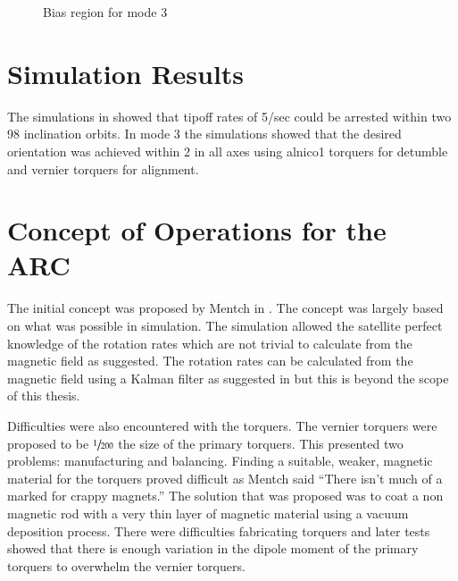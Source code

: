 \begin{figure}[htb!]
    \caption{Bias region for mode 3}
    \label{fig:m3b}
\end{figure}

\section{Simulation Results}

The simulations in \cite{Mentch11} showed that tipoff rates of 5\textdegree/sec could be arrested within two 98\textdegree{} inclination orbits. In mode 3 the simulations showed that the desired orientation was achieved within 2\textdegree{} in all axes using alnico1 torquers for detumble and vernier torquers for alignment.


\section{Concept of Operations for the \acl*{ARC}}

The initial concept was proposed by Mentch in \cite{Mentch11}. The concept was largely based on what was possible in simulation. The simulation allowed the satellite perfect knowledge of the rotation rates which are not trivial to calculate from the magnetic field as suggested. The rotation rates can be calculated from the magnetic field using a Kalman filter as suggested in \cite{Sturm05} but this is beyond the scope of this thesis.

Difficulties were also encountered with the torquers. The vernier torquers were proposed to be $\sfrac{1}{200}$ the size of the primary torquers. This presented two problems: manufacturing and balancing. Finding a suitable, weaker, magnetic material for the torquers proved difficult as Mentch said \enquote{There isn't much of a marked for crappy magnets.} The solution that was proposed was to coat a non magnetic rod with a very thin layer of magnetic material using a vacuum deposition process. There were difficulties fabricating torquers and later tests showed that there is enough variation in the dipole moment of the primary torquers to overwhelm the vernier torquers. 


